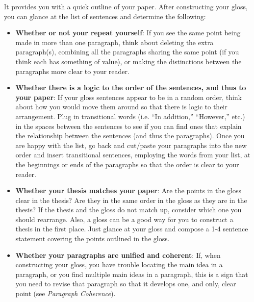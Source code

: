 \documentclass[12pt, hidelinks]{article} %
\begin{document}
It provides you with a quick outline of your paper. After constructing your gloss, you can glance at the list of sentences and determine the following:
 \begin{itemize}
        
\item \textbf{Whether or not your repeat yourself}: If you see the same point being made in 
more than one paragraph, think about deleting the extra paragraph(s), 
combining all the paragraphs sharing the same point (if you think each has 
something of value), or making the distinctions between the paragraphs more 
clear to your reader.
        
\item \textbf{Whether there is a logic to the order of the sentences, and thus to your paper}:
If your gloss sentences appear to be in a random order, think about how you would move them around so that there is logic to their arrangement.  Plug in transitional words (i.e. “In addition,” “However,” etc.)  in the spaces between the sentences to see if you can find ones that explain the relationship between the sentences (and thus the paragraphs). Once you are happy with the list, go back and cut/paste your paragraphs into the new order and insert transitional sentences, employing the words from your list, at the beginnings or ends of the paragraphs so that the order is clear to your reader.

\item \textbf{Whether your thesis matches your paper}: Are the points in the gloss clear in the thesis? Are they in the same order in the gloss as they are in the thesis? If the thesis and the gloss do not match up, consider which one you should rearrange. Also, a gloss can be a good way for you to construct a thesis in the first place. Just glance at your gloss and compose a 1-4 sentence statement covering the points outlined in the gloss.

\item \textbf{Whether your paragraphs are unified and coherent}: If, when constructing your 
gloss, you have trouble locating the main idea in a paragraph, or you find multiple main ideas in a paragraph, this is a sign that you need to revise that paragraph so that it develops one, and only, clear point (see \emph{Paragraph Coherence}).
\end{itemize}

 
 

 
 
\end{document}
